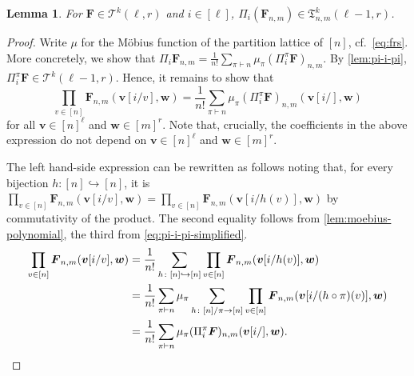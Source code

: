 \documentclass[11pt, DIV=15]{scrarticle}
\theoremstyle{definition}
\newtheorem{example}[definition]{Example}
\theoremstyle{plain}
\newtheorem{lemma}[definition]{Lemma}
\theoremstyle{remark}
\begin{document}
	\begin{lemma}\label{lem:product-one-graph}
		For $\boldsymbol{F} \in \mathcal{T}^k(\ell, r)$ and $i \in [\ell]$,
		 $\Pi_i (\boldsymbol{F}_{n,m}) \in \mathfrak{T}^k_{n, m}(\ell-1, r)$.
	\end{lemma}
	\begin{proof}
		Write $\mu$ for the Möbius function of the partition lattice of $[n]$, cf.\ \cref{eq:frs}.
		More concretely, 
		we show that $\Pi_i \boldsymbol{F}_{n,m} = \frac{1}{n!} \sum_{\pi \vdash n} \mu_\pi (\Pi_i^\pi \boldsymbol{F})_{n,m}$.
		By \cref{lem:pi-i-pi},  $\Pi^\pi_i\boldsymbol{F} \in \mathcal{T}^k(\ell-1, r)$.
		Hence, it remains to show that
		\[
		\prod_{v \in [n]} \boldsymbol{F}_{n,m}(\boldsymbol{v}[i/v], \boldsymbol{w})
		=  \frac{1}{n!} \sum_{\pi \vdash n} \mu_{\pi} (\Pi^\pi_i\boldsymbol{F})_{n, m}(\boldsymbol{v}[i/], \boldsymbol{w})
		\]
		for all $\boldsymbol{v} \in [n]^\ell$ and $\boldsymbol{w} \in [m]^r$.
		Note that, crucially, the coefficients in the above expression do not depend on $\boldsymbol{v} \in [n]^\ell$ and $\boldsymbol{w} \in [m]^r$.
		
		 
		
		The left hand-side expression can be rewritten as follows noting that, for every bijection $h \colon [n] \hookrightarrow [n]$, it is 
		$\prod_{v \in [n]} \boldsymbol{F}_{n,m}(\boldsymbol{v}[i/v], \boldsymbol{w}) = \prod_{v \in [n]} \boldsymbol{F}_{n,m}(\boldsymbol{v}[i/h(v)], \boldsymbol{w})$
		by commutativity of the product.
		The second equality follows from \cref{lem:moebius-polynomial},
		the third from \cref{eq:pi-i-pi-simplified}.
		\begin{align*}
			\prod_{v \in [n]} \boldsymbol{F}_{n,m}(\boldsymbol{v}[i/v], \boldsymbol{w})
			&= \frac{1}{n!} \sum_{h \colon [n] \hookrightarrow [n]} \prod_{v \in [n]} \boldsymbol{F}_{n,m}(\boldsymbol{v}[i/h(v)], \boldsymbol{w}) \\
			&= \frac{1}{n!} \sum_{\pi \vdash n} \mu_\pi \sum_{h \colon [n]/\pi \to [n]} \prod_{v \in [n]} \boldsymbol{F}_{n,m}(\boldsymbol{v}[i/(h \circ \pi)(v)], \boldsymbol{w}) \\
			&= \frac{1}{n!} \sum_{\pi \vdash n} \mu_\pi (\Pi^\pi_i \boldsymbol{F})_{n,m}(\boldsymbol{v}[i/], \boldsymbol{w}). \qedhere
		\end{align*}
	\end{proof}
%
\end{document}
